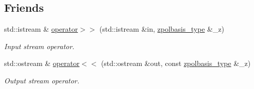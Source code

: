 \subsection*{Friends}
\begin{DoxyCompactItemize}
\item 
std::istream \& \hyperlink{classzsig_1_1ZernikePolynomialsBasisT_a16e900fb79af142ae4b65b1b7a0c5802}{operator$>$$>$} (std::istream \&in, \hyperlink{classzsig_1_1ZernikePolynomialsBasisT}{zpolbasis\_\-type} \&\_\-z)
\begin{DoxyCompactList}\small\item\em Input stream operator. \item\end{DoxyCompactList}\item 
std::ostream \& \hyperlink{classzsig_1_1ZernikePolynomialsBasisT_a9d42337c8ce1a6a1d19bfc2baf012366}{operator$<$$<$} (std::ostream \&out, const \hyperlink{classzsig_1_1ZernikePolynomialsBasisT}{zpolbasis\_\-type} \&\_\-z)
\begin{DoxyCompactList}\small\item\em Output stream operator. \item\end{DoxyCompactList}\end{DoxyCompactItemize}
